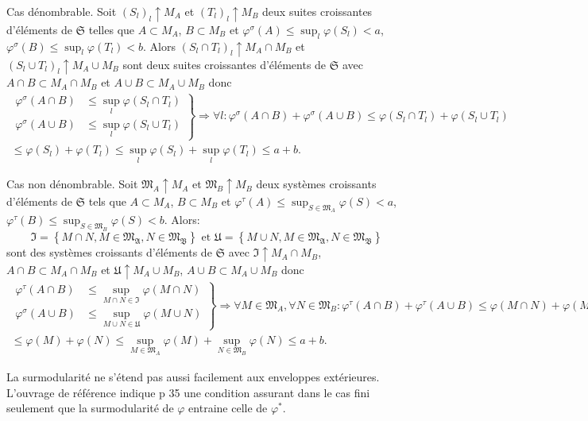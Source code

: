 \begin{demo}
Cas dénombrable.\newline
Soit $(S_l)_l \uparrow M_A$ et $(T_l)_l \uparrow M_B$ deux suites croissantes d'éléments de $\mathfrak{S}$ telles que $A \subset M_A$, $B \subset M_B$ et $\varphi^\sigma(A) \leq \sup_l \varphi(S_l) < a$, $\varphi^\sigma(B) \leq \sup_l \varphi(T_l) < b$. Alors $(S_l \cap T_l)_l\uparrow M_A \cap M_B$ et $(S_l \cup T_l)_l\uparrow M_A \cup M_B$ sont deux suites croissantes d'éléments de $\mathfrak{S}$ avec $A \cap B \subset M_A \cap M_B$ et $A \cup B \subset M_A \cup M_B$ donc
\begin{multline*}
 \left.
   \begin{aligned}
     \varphi^\sigma(A \cap B) &\leq \sup_l \varphi(S_l \cap T_l) \\
     \varphi^\sigma(A \cup B) &\leq \sup_l \varphi(S_l \cup T_l)
   \end{aligned}
 \right\rbrace
 \Rightarrow \forall l : \varphi^\sigma(A \cap B) + \varphi^\sigma(A \cup B) \leq \varphi(S_l \cap T_l) + \varphi(S_l \cup T_l) \\
 \leq \varphi(S_l) + \varphi(T_l) \leq \sup_l \varphi(S_l) + \sup_l \varphi(T_l) \leq a + b.
\end{multline*}


Cas non dénombrable.\newline
Soit $\mathfrak{M}_A \uparrow M_A$ et $\mathfrak{M}_B \uparrow M_B$ deux systèmes croissants d'éléments de $\mathfrak{S}$ tels que $A \subset M_A$, $B \subset M_B$ et $\varphi^\tau(A) \leq \sup_{S \in \mathfrak{M}_A} \varphi(S) < a$, $\varphi^\tau(B) \leq \sup_{S \in \mathfrak{M}_B} \varphi(S) < b$. Alors:
\begin{displaymath}
 \mathfrak{I} = \left\lbrace M \cap N, M \in \mathfrak{M_A}, N \in \mathfrak{M_B}\right\rbrace \text{ et }
 \mathfrak{U} = \left\lbrace M \cup N, M \in \mathfrak{M_A}, N \in \mathfrak{M_B}\right\rbrace
\end{displaymath}
sont des systèmes croissants d'éléments de $\mathfrak{S}$ avec $\mathfrak{I}\uparrow M_A \cap M_B$, $A \cap B \subset M_A \cap M_B$ et $\mathfrak{U}\uparrow M_A \cup M_B$, $A \cup B \subset M_A \cup M_B$ donc
\begin{multline*}
 \left.
   \begin{aligned}
     \varphi^\tau(A \cap B) &\leq \sup_{M \cap N \in \mathfrak{I}} \varphi(M \cap N) \\
     \varphi^\sigma(A \cup B) &\leq \sup_{M \cup N \in \mathfrak{U}} \varphi(M \cup N)
   \end{aligned}
 \right\rbrace
 \Rightarrow \forall M \in \mathfrak{M}_A, \forall N \in \mathfrak{M}_B : \varphi^\tau(A \cap B) + \varphi^\tau(A \cup B) \leq \varphi(M \cap N) + \varphi(M \cup N) \\
 \leq \varphi(M) + \varphi(N) \leq \sup_{M \in \mathfrak{M}_A} \varphi(M) + \sup_{N \in \mathfrak{M}_B} \varphi(N) \leq a + b.
\end{multline*}
\end{demo}
\noindent La surmodularité ne s'étend pas aussi facilement aux enveloppes extérieures. L'ouvrage de référence indique p 35 une condition assurant dans le cas fini seulement que la surmodularité de $\varphi$ entraine celle de $\varphi^*$.

